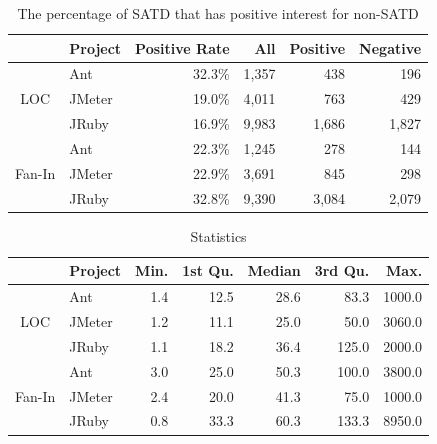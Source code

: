 \begin{table}[tb]
  \caption{The percentage of SATD that has positive interest for non-SATD}
  \label{tab:percentage_non-SATD}
  \centering

  \begin{tabular}{cl|r|rrr}
  \hline
      &  Project & Positive Rate & All & Positive & Negative \\
  \hline
        & Ant    & 32.3\% & 1,357 &  438  &   196 \\
   LOC  & JMeter & 19.0\% & 4,011 &  763  &   429 \\
        & JRuby  & 16.9\% & 9,983 & 1,686 & 1,827 \\
  \hline
        & Ant    & 22.3\% & 1,245 &   278  &   144 \\
Fan-In  & JMeter & 22.9\% & 3,691 &   845  &   298 \\
        & JRuby  & 32.8\% & 9,390 & 3,084  & 2,079 \\
  \hline
  \end{tabular}
\end{table}

\begin{table}[tb]
  \caption{Statistics}
  \label{tab:statistic_non-SATD}
  \centering

  \begin{tabular}{cl|rrrrr}
  \hline
      &  Project & Min. & 1st Qu. & Median & 3rd Qu. & Max. \\
  \hline
        & Ant    & 1.4 &  12.5 &  28.6  &   83.3 & 1000.0 \\
   LOC  & JMeter & 1.2 &  11.1 &  25.0  &   50.0 & 3060.0 \\
        & JRuby  & 1.1 &  18.2 &  36.4  &  125.0 & 2000.0 \\
  \hline
        & Ant    & 3.0 &  25.0 &  50.3  &  100.0 & 3800.0 \\
Fan-In  & JMeter & 2.4 &  20.0 &  41.3  &   75.0 & 1000.0 \\
        & JRuby  & 0.8 &  33.3 &  60.3  &  133.3 & 8950.0 \\
  \hline
  \end{tabular}
\end{table}

